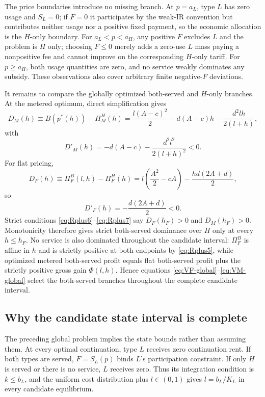 The price boundaries introduce no missing branch. At $p=a_L$, type $L$ has zero usage and $S_L=0$; if $F=0$ it participates by the weak-IR convention but contributes neither usage nor a positive fixed payment, so the economic allocation is the $H$-only boundary. For $a_L<p<a_H$, any positive $F$ excludes $L$ and the problem is $H$ only; choosing $F\leq0$ merely adds a zero-use $L$ mass paying a nonpositive fee and cannot improve on the corresponding $H$-only tariff. For $p\geq a_H$, both usage quantities are zero, and no service weakly dominates any subsidy. These observations also cover arbitrary finite negative-$F$ deviations.

It remains to compare the globally optimized both-served and $H$-only branches. At the metered optimum, direct simplification gives
\begin{equation}
 D_M(h)\equiv B(p^*(h))-\Pi_M^H(h)
 =\frac{l(A-c)^2}{2}-d(A-c)h-\frac{d^2lh}{2(l+h)},
 \label{eq:DM}
\end{equation}
with
\begin{equation}
 D'_M(h)=-d(A-c)-\frac{d^2l^2}{2(l+h)^2}<0.
 \label{eq:DMprime}
\end{equation}
For flat pricing,
\begin{equation}
 D_F(h)\equiv\Pi_F^B(l,h)-\Pi_F^H(h)
 =l\left(\frac{A^2}{2}-cA\right)-\frac{hd(2A+d)}{2},
 \label{eq:DF}
\end{equation}
so
\begin{equation}
 D'_F(h)=-\frac{d(2A+d)}{2}<0.
 \label{eq:DFprime}
\end{equation}
Strict conditions \eqref{eq:Rplus6}--\eqref{eq:Rplus7} say $D_F(h_F)>0$ and $D_M(h_F)>0$. Monotonicity therefore gives strict both-served dominance over $H$ only at every $h\leq h_F$. No service is also dominated throughout the candidate interval: $\Pi_F^B$ is affine in $h$ and is strictly positive at both endpoints by \eqref{eq:Rplus5}, while optimized metered both-served profit equals flat both-served profit plus the strictly positive gross gain $\Phi(l,h)$. Hence equations \eqref{eq:VF-global}--\eqref{eq:VM-global} select the both-served branches throughout the complete candidate interval.

\subsection{Why the candidate state interval is complete}\label{app:candidate-completeness}

The preceding global problem implies the state bounds rather than assuming them. At every optimal continuation, type $L$ receives zero continuation rent. If both types are served, $F=S_L(p)$ binds $L$'s participation constraint. If only $H$ is served or there is no service, $L$ receives zero. Thus its integration condition is $k\leq b_L$, and the uniform cost distribution plus $l\in(0,1)$ gives $l=b_L/K_L$ in every candidate equilibrium.

